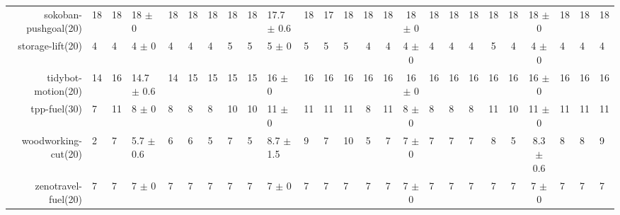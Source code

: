 \begin{center}
\begin{tabular}{|rHHHHHHHHHHHHcccHHH|cccHHH|}
sokoban-pushgoal(20) & 18 & 18 & 18 $\pm$ 0 & 18 & 18 & 18 & 18 & 18 & 17.7 $\pm$ 0.6 & 18 & 17 & 18 & 18 & 18 & 18 $\pm$ 0 & 18 & 18 & 18 & 18 & 18 & 18 $\pm$ 0 & 18 & 18 & 18\\
storage-lift(20) & 4 & 4 & 4 $\pm$ 0 & 4 & 4 & 4 & 5 & 5 & 5 $\pm$ 0 & 5 & 5 & 5 & 4 & 4 & 4 $\pm$ 0 & 4 & 4 & 4 & 5 & 4 & 4 $\pm$ 0 & 4 & 4 & 4\\
tidybot-motion(20) & 14 & 16 & 14.7 $\pm$ 0.6 & 14 & 15 & 15 & 15 & 15 & 16 $\pm$ 0 & 16 & 16 & 16 & 16 & 16 & 16 $\pm$ 0 & 16 & 16 & 16 & 16 & 16 & 16 $\pm$ 0 & 16 & 16 & 16\\
tpp-fuel(30) & 7 & 11 & 8 $\pm$ 0 & 8 & 8 & 8 & 10 & 10 & 11 $\pm$ 0 & 11 & 11 & 11 & 8 & 11 & 8 $\pm$ 0 & 8 & 8 & 8 & 11 & 10 & 11 $\pm$ 0 & 11 & 11 & 11\\
woodworking-cut(20) & 2 & 7 & 5.7 $\pm$ 0.6 & 6 & 6 & 5 & 7 & 5 & 8.7 $\pm$ 1.5 & 9 & 7 & 10 & 5 & 7 & 7 $\pm$ 0 & 7 & 7 & 7 & 8 & 5 & 8.3 $\pm$ 0.6 & 8 & 8 & 9\\
zenotravel-fuel(20) & 7 & 7 & 7 $\pm$ 0 & 7 & 7 & 7 & 7 & 7 & 7 $\pm$ 0 & 7 & 7 & 7 & 7 & 7 & 7 $\pm$ 0 & 7 & 7 & 7 & 7 & 7 & 7 $\pm$ 0 & 7 & 7 & 7\\
\end{tabular}
\end{center}
